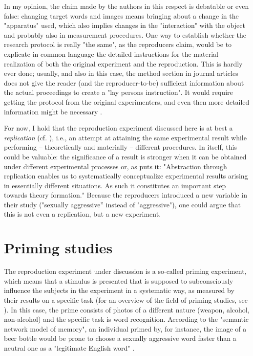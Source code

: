 \documentclass[twocolumn, serif, authordate, reflection]{jote-article}
\begin{document}
In my opinion, the claim made by the authors in this respect is debatable or even false: changing target words and images means bringing about a change in the "apparatus" used, which also implies changes in the "interaction" with the object and probably also in measurement procedures. One way to establish whether the research protocol is really "the same", as the reproducers claim, would be to explicate in common language the detailed instructions for the material realization of both the original experiment and the reproduction. This is hardly ever done; usually, and also in this case, the method section in journal articles does not give the reader (and the reproducer-to-be) sufficient information about the actual proceedings to create a "lay persons instruction". It would require getting the protocol from the original experimenters, and even then more detailed information might be necessary \parencite{Collins1985}. 

For now, I hold that the reproduction experiment discussed here is at best a \textit{replication }(cf. \cite{Radder1996}), i.e., an attempt at attaining the same experimental result while performing – theoretically and materially – different procedures. In itself, this could be valuable: the significance of a result is stronger when it can be obtained under different experimental processes or, as \textcite[p. 84]{Radder1996} puts it: "Abstraction through replication enables us to systematically conceptualize experimental results arising in essentially different situations. As such it constitutes an important step towards theory formation."  Because the reproducers introduced a new variable in their study ("sexually aggressive” instead of "aggressive"), one could argue that this is not even a replication, but a new experiment. 


{}
\section*{Priming studies}



The reproduction experiment under discussion is a so-called priming experiment, which means that a stimulus is presented that is supposed to subconsciously influence the subjects in the experiment in a systematic way, as measured by their results on a specific task (for an overview of the field of priming studies, see \cite{Derksen2017}). In this case, the prime consists of photos of a different nature (weapon, alcohol, non-alcohol) and the specific task is word recognition. According to the "semantic network model of memory", an individual primed by, for instance, the image of a beer bottle would be prone to choose a sexually aggressive word faster than a neutral one as a "legitimate English word"  \parencite[p. 10]{Leboeuf2020}. 
 
\end{document}
